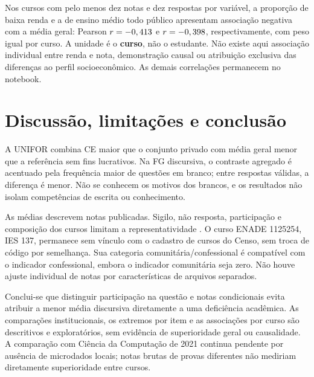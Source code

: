 \documentclass[12pt,a4paper]{article}
\begin{document}
Nos \EcoCursos{} cursos com pelo menos dez notas e dez respostas por variável,
a proporção de baixa renda e a de ensino médio todo público apresentam
associação negativa com a média geral: Pearson $r=-0,413{}$ e
$r=-0,398{}$, respectivamente, com peso igual por curso. A unidade é o
\textbf{curso}, não o estudante. Não existe aqui associação individual entre
renda e nota, demonstração causal ou atribuição exclusiva das diferenças ao
perfil socioeconômico. As demais correlações permanecem no notebook.

\section{Discussão, limitações e conclusão}
A UNIFOR combina CE maior que o conjunto privado com média geral menor que a
referência sem fins lucrativos. Na FG discursiva, o contraste agregado é
acentuado pela frequência maior de questões em branco; entre respostas válidas,
a diferença é menor. Não se conhecem os motivos dos brancos, e os resultados
não isolam competências de escrita ou conhecimento.

As médias descrevem notas publicadas. Sigilo, não resposta, participação e
composição dos cursos limitam a representatividade \cite[pp.~7--8]{manual}.
O curso ENADE 1125254, IES 137, permanece sem vínculo com o cadastro de cursos
do Censo, sem troca de código por semelhança. Sua categoria comunitária/confessional
é compatível com o indicador confessional, embora o indicador comunitária seja zero.
Não houve ajuste individual de notas por características de arquivos separados.

Conclui-se que distinguir participação na questão e notas condicionais evita
atribuir a menor média discursiva diretamente a uma deficiência acadêmica.
As comparações institucionais, os extremos por item e as associações por curso
são descritivos e exploratórios, sem evidência de superioridade geral ou causalidade.
A comparação com Ciência da Computação de 2021 continua pendente por ausência
de microdados locais; notas brutas de provas diferentes não mediriam diretamente
superioridade entre cursos.
\end{document}
